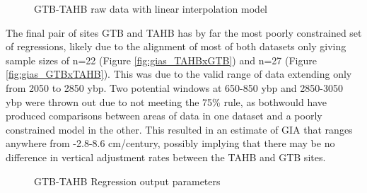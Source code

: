 \begin{figure}[h]
	\caption{GTB-TAHB raw data with linear interpolation model}
	\label{fig:data_GTBxTAHB}
\end{figure}
The final pair of sites GTB and TAHB has by far the most poorly constrained set
of regressions, likely due to the alignment of most of both datasets only giving
sample sizes of n=22 (Figure \ref{fig:gias_TAHBxGTB}) and n=27 (Figure \ref{fig:gias_GTBxTAHB}).
This was due to the valid range of data extending only from 2050 to 2850 ybp. Two
potential windows at 650-850 ybp and 2850-3050 ybp were thrown out due to not
meeting the 75\% rule, as bothwould have produced comparisons between areas of
data in one dataset and a poorly constrained model in the other.
This resulted in an estimate of GIA that ranges anywhere from -2.8-8.6 cm/century,
possibly implying that there may be no difference in vertical adjustment rates
between the TAHB and GTB sites. 

\begin{figure}[h]
	\begin{flushleft}
	\end{flushleft}
	\caption{GTB-TAHB Regression output parameters}
	\label{fig:GTBxTAHB_regression}
\end{figure}

\newpage

